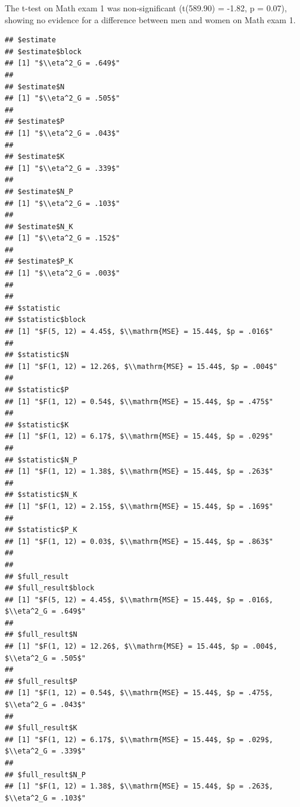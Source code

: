 \documentclass[english,floatsintext,man]{apa6}
\theoremstyle{definition}
\theoremstyle{definition}
\theoremstyle{definition}
\theoremstyle{remark}
\begin{document}
The t-test on Math exam 1 was non-significant (t(589.90) = -1.82, p =
0.07), showing no evidence for a difference between men and women on
Math exam 1.

\begin{verbatim}
## $estimate
## $estimate$block
## [1] "$\\eta^2_G = .649$"
## 
## $estimate$N
## [1] "$\\eta^2_G = .505$"
## 
## $estimate$P
## [1] "$\\eta^2_G = .043$"
## 
## $estimate$K
## [1] "$\\eta^2_G = .339$"
## 
## $estimate$N_P
## [1] "$\\eta^2_G = .103$"
## 
## $estimate$N_K
## [1] "$\\eta^2_G = .152$"
## 
## $estimate$P_K
## [1] "$\\eta^2_G = .003$"
## 
## 
## $statistic
## $statistic$block
## [1] "$F(5, 12) = 4.45$, $\\mathrm{MSE} = 15.44$, $p = .016$"
## 
## $statistic$N
## [1] "$F(1, 12) = 12.26$, $\\mathrm{MSE} = 15.44$, $p = .004$"
## 
## $statistic$P
## [1] "$F(1, 12) = 0.54$, $\\mathrm{MSE} = 15.44$, $p = .475$"
## 
## $statistic$K
## [1] "$F(1, 12) = 6.17$, $\\mathrm{MSE} = 15.44$, $p = .029$"
## 
## $statistic$N_P
## [1] "$F(1, 12) = 1.38$, $\\mathrm{MSE} = 15.44$, $p = .263$"
## 
## $statistic$N_K
## [1] "$F(1, 12) = 2.15$, $\\mathrm{MSE} = 15.44$, $p = .169$"
## 
## $statistic$P_K
## [1] "$F(1, 12) = 0.03$, $\\mathrm{MSE} = 15.44$, $p = .863$"
## 
## 
## $full_result
## $full_result$block
## [1] "$F(5, 12) = 4.45$, $\\mathrm{MSE} = 15.44$, $p = .016$, $\\eta^2_G = .649$"
## 
## $full_result$N
## [1] "$F(1, 12) = 12.26$, $\\mathrm{MSE} = 15.44$, $p = .004$, $\\eta^2_G = .505$"
## 
## $full_result$P
## [1] "$F(1, 12) = 0.54$, $\\mathrm{MSE} = 15.44$, $p = .475$, $\\eta^2_G = .043$"
## 
## $full_result$K
## [1] "$F(1, 12) = 6.17$, $\\mathrm{MSE} = 15.44$, $p = .029$, $\\eta^2_G = .339$"
## 
## $full_result$N_P
## [1] "$F(1, 12) = 1.38$, $\\mathrm{MSE} = 15.44$, $p = .263$, $\\eta^2_G = .103$"

\end{verbatim}
\end{document}
